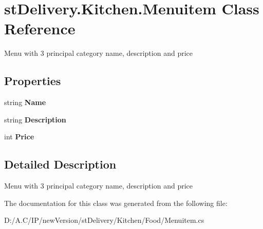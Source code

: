 \hypertarget{classst_delivery_1_1_kitchen_1_1_menuitem}{}\section{st\+Delivery.\+Kitchen.\+Menuitem Class Reference}
\label{classst_delivery_1_1_kitchen_1_1_menuitem}


Menu with 3 principal category name, description and price  


\subsection*{Properties}
\begin{DoxyCompactItemize}
\item 
\mbox{\label{classst_delivery_1_1_kitchen_1_1_menuitem_a774aa4859c85a1564c60e277159958ef}} 
string {\bfseries Name}
\item 
\mbox{\label{classst_delivery_1_1_kitchen_1_1_menuitem_a83d77cb328c52d14a145a8a6dd3230d3}} 
string {\bfseries Description}
\item 
\mbox{\label{classst_delivery_1_1_kitchen_1_1_menuitem_a87cf7f3d839405137af6093cb29828c9}} 
int {\bfseries Price}
\end{DoxyCompactItemize}


\subsection{Detailed Description}
Menu with 3 principal category name, description and price 



The documentation for this class was generated from the following file\+:\begin{DoxyCompactItemize}
\item 
D\+:/\+A.\+C/\+I\+P/new\+Version/st\+Delivery/\+Kitchen/\+Food/Menuitem.\+cs\end{DoxyCompactItemize}
